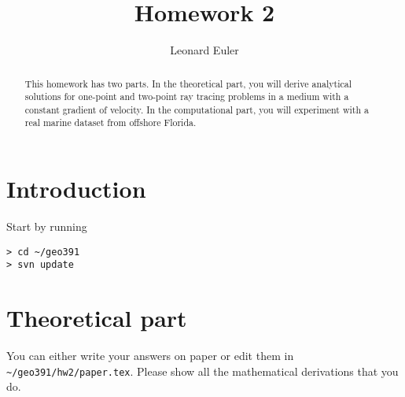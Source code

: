 \author{Leonard Euler} 
\title{Homework 2}

\begin{abstract}
This homework has two parts. In the theoretical part, you will derive
analytical solutions for one-point and two-point ray tracing problems
in a medium with a constant gradient of velocity. In the computational
part, you will experiment with a real marine dataset from offshore
Florida.
\end{abstract}

\section{Introduction}

Start by running
\begin{verbatim}
> cd ~/geo391
> svn update
\end{verbatim}

\section{Theoretical part}

You can either write your answers on paper or edit them in
\verb#~/geo391/hw2/paper.tex#. Please show all the mathematical derivations that
you do.


